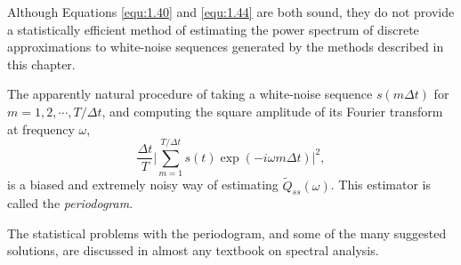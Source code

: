 \begin{rem}
  Although Equations \ref{equ:1.40} and \ref{equ:1.44} are both sound, they do not provide a statistically efficient method of estimating the power spectrum of discrete approximations to white-noise sequences generated by the methods described in this chapter.
\end{rem}

\begin{defn}
   The apparently natural procedure of taking a white-noise sequence $s(m\Delta{t})$ for $m=1,2,\cdots, T/\Delta{t}$, and computing the square amplitude of its Fourier transform at frequency $\omega$,
  \begin{equation*}
    \frac{\Delta{t}}{T} \Bigg |\sum_{m=1}^{T/\Delta{t}}s(t)\exp(-i\omega m\Delta{t}) \Bigg |^2,
  \end{equation*}
  is a biased and extremely noisy way of estimating $\widetilde{Q}_{ss}(\omega)$. This estimator is called the \emph{periodogram}.
\end{defn}

\begin{rem}
  The statistical problems with the periodogram, and some of the many suggested solutions, are discussed in almost any textbook on spectral analysis.
\end{rem}

